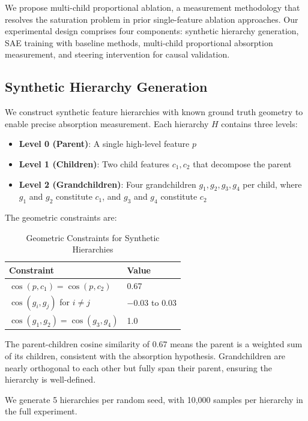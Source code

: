 \documentclass{article}
\begin{document}
We propose multi-child proportional ablation, a measurement methodology that resolves the saturation problem in prior single-feature ablation approaches. Our experimental design comprises four components: synthetic hierarchy generation, SAE training with baseline methods, multi-child proportional absorption measurement, and steering intervention for causal validation.

\subsection{Synthetic Hierarchy Generation}

We construct synthetic feature hierarchies with known ground truth geometry to enable precise absorption measurement. Each hierarchy $H$ contains three levels:

\begin{itemize}
\item \textbf{Level 0 (Parent)}: A single high-level feature $p$
\item \textbf{Level 1 (Children)}: Two child features $c_1, c_2$ that decompose the parent
\item \textbf{Level 2 (Grandchildren)}: Four grandchildren $g_1, g_2, g_3, g_4$ per child, where $g_1$ and $g_2$ constitute $c_1$, and $g_3$ and $g_4$ constitute $c_2$
\end{itemize}

The geometric constraints are:

\begin{table}[h]
\caption{Geometric Constraints for Synthetic Hierarchies}
\label{tab:geom_constraints}
\centering
\begin{tabular}{ll}
\toprule
Constraint & Value \\
\midrule
$\cos(p, c_1) = \cos(p, c_2)$ & 0.67 \\
$\cos(g_i, g_j)$ for $i \neq j$ & $-0.03$ to $0.03$ \\
$\cos(g_1, g_2) = \cos(g_3, g_4)$ & 1.0 \\
\bottomrule
\end{tabular}
\end{table}

The parent-children cosine similarity of 0.67 means the parent is a weighted sum of its children, consistent with the absorption hypothesis. Grandchildren are nearly orthogonal to each other but fully span their parent, ensuring the hierarchy is well-defined.

We generate 5 hierarchies per random seed, with 10,000 samples per hierarchy in the full experiment.
\end{document}
